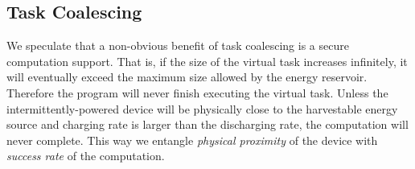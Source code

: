 \subsection{Task Coalescing}
\label{sec:discussion_coalescing}

We speculate that a non-obvious benefit of task coalescing is a secure computation support. That is, if the size of the virtual task increases infinitely, it will eventually exceed the maximum size allowed by the energy reservoir. Therefore the program will never finish executing the virtual task. Unless the intermittently-powered device will be physically close to the harvestable energy source and charging rate is larger than the discharging rate, the computation will never complete. This way we entangle \emph{physical proximity} of the device with \emph{success rate} of the computation.